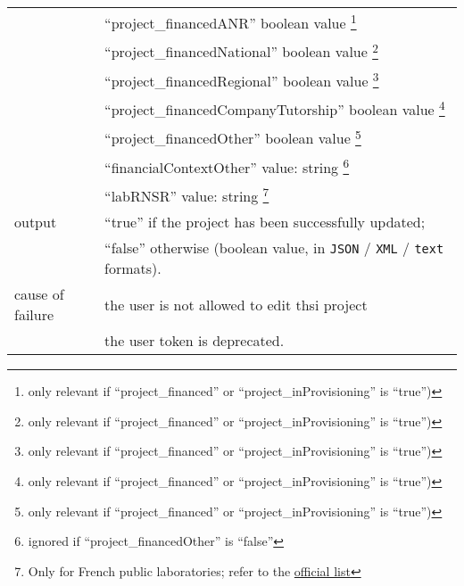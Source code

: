\begin{tabular}{ | l | l | }
	\space & ``project\_financedANR'' boolean value \footnote{only relevant if ``project\_financed'' or ``project\_inProvisioning'' is ``true'')} \\
	\space & ``project\_financedNational'' boolean value \footnote{only relevant if ``project\_financed'' or ``project\_inProvisioning'' is ``true'')} \\
	\space & ``project\_financedRegional'' boolean value \footnote{only relevant if ``project\_financed'' or ``project\_inProvisioning'' is ``true'')} \\
	\space & ``project\_financedCompanyTutorship'' boolean value \footnote{only relevant if ``project\_financed'' or ``project\_inProvisioning'' is ``true'')} \\
	\space & ``project\_financedOther'' boolean value \footnote{only relevant if ``project\_financed'' or ``project\_inProvisioning'' is ``true'')} \\
	\space & ``financialContextOther'' value: string \footnote{ignored if ``project\_financedOther'' is ``false''} \\
	\space & ``labRNSR'' value: string \footnote{Only for French public laboratories; refer to the \href{https://www.data.gouv.fr/fr/datasets/repertoire-national-des-structures-de-recherche-rnsr/}{official list}} \\
	\hline
	output & ``true'' if the project has been successfully updated; \\
	\space & ``false'' otherwise (boolean value, in \texttt{JSON} / \texttt{XML} / \texttt{text} formats). \\
	\hline
	cause of failure &the user is not allowed to edit thsi project \\
	\space & the user token is deprecated. \\
	\hline
\end{tabular}
\newline

